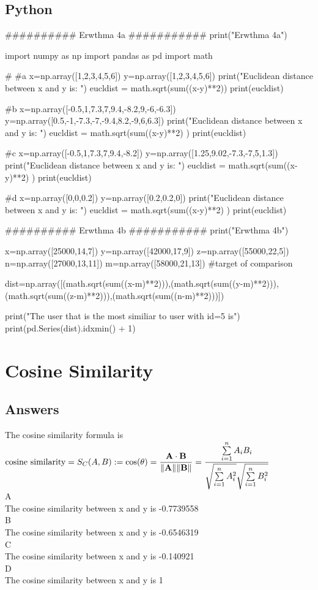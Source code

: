 \documentclass[10pt,towside,a4paper]{article}
\begin{document}
\subsection{Python}
\begin{python}
	##########  Erwthma 4a ###########
	print("Erwthma 4a")
	
	import numpy as np
	import pandas as pd
	import math
	
	#%
	#a
	x=np.array([1,2,3,4,5,6])
	y=np.array([1,2,3,4,5,6])
	print("Euclidean distance between x and y is: ")
	eucldist = math.sqrt(sum((x-y)**2))
	print(eucldist)
	
	#b
	x=np.array([-0.5,1,7.3,7,9.4,-8.2,9,-6,-6.3])
	y=np.array([0.5,-1,-7.3,-7,-9.4,8.2,-9,6,6.3])
	print("Euclidean distance between x and y is: ")
	eucldist = math.sqrt(sum((x-y)**2) )
	print(eucldist)
	
	#c
	x=np.array([-0.5,1,7.3,7,9.4,-8.2])
	y=np.array([1.25,9.02,-7.3,-7,5,1.3])
	print("Euclidean distance between x and y is: ")
	eucldist = math.sqrt(sum((x-y)**2) )
	print(eucldist)
	
	#d
	x=np.array([0,0,0.2])
	y=np.array([0.2,0.2,0])
	print("Euclidean distance between x and y is: ")
	eucldist = math.sqrt(sum((x-y)**2) )
	print(eucldist)
	
	##########  Erwthma 4b ###########
	print("Erwthma 4b")
	
	x=np.array([25000,14,7])
	y=np.array([42000,17,9])
	z=np.array([55000,22,5])
	n=np.array([27000,13,11])
	m=np.array([58000,21,13]) #target of comparison
	
	dist=np.array([(math.sqrt(sum((x-m)**2))),(math.sqrt(sum((y-m)**2))),(math.sqrt(sum((z-m)**2))),(math.sqrt(sum((n-m)**2)))])
	
	print("\n The user that is the most similiar to user with id=5 is")
	print(pd.Series(dist).idxmin() + 1)

\end{python}
\section{Cosine Similarity}
\subsection{Answers}
The cosine similarity formula is ${\displaystyle {\text{cosine similarity}}=S_{C}(A,B):=\cos(\theta )={\mathbf {A} \cdot \mathbf {B}  \over \|\mathbf {A} \|\|\mathbf {B} \|}={\frac {\sum \limits _{i=1}^{n}{A_{i}B_{i}}}{{\sqrt {\sum \limits _{i=1}^{n}{A_{i}^{2}}}}{\sqrt {\sum \limits _{i=1}^{n}{B_{i}^{2}}}}}}}$
\\
A\\
The cosine similarity between x and y is -0.7739558\\
B\\
The cosine similarity between x and y is -0.6546319 \\
C\\
The cosine similarity between x and y is -0.140921 \\
D\\
The cosine similarity between x and y is 1 \\
\end{document}
